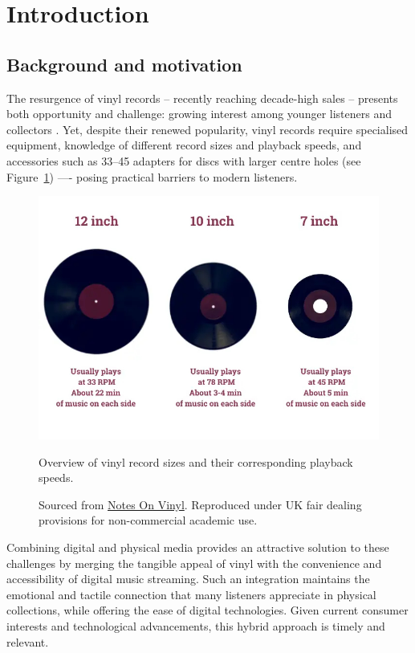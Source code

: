     \section{Introduction}
    
        \subsection{Background and motivation}
    
            The resurgence of vinyl records -- recently reaching decade-high sales \cite{geraghty2023uk_vinyl_sales} -- presents both opportunity and challenge: growing interest among younger listeners and collectors \cite{Trapp2023}. Yet, despite their renewed popularity, vinyl records require specialised equipment, knowledge of different record sizes and playback speeds, and accessories such as 33–45 adapters for discs with larger centre holes (see Figure~\ref{fig:vinylSizes}) —- posing practical barriers to modern listeners.
    
            \begin{figure}[htbp]
                \centering
                \includegraphics[width=0.8\linewidth]{images/33vs45.jpg}
                \caption{Overview of vinyl record sizes and their corresponding playback speeds.}
                \caption*{Sourced from \href{https://notesonvinyl.com/the-difference-between-33-vs-45-vinyl/}{Notes On Vinyl}. Reproduced under UK fair dealing provisions for non-commercial academic use.}
                \label{fig:vinylSizes}
            \end{figure}
    
            Combining digital and physical media provides an attractive solution to these challenges by merging the tangible appeal of vinyl with the convenience and accessibility of digital music streaming. Such an integration maintains the emotional and tactile connection that many listeners appreciate in physical collections, while offering the ease of digital technologies. Given current consumer interests and technological advancements, this hybrid approach is timely and relevant.
        
